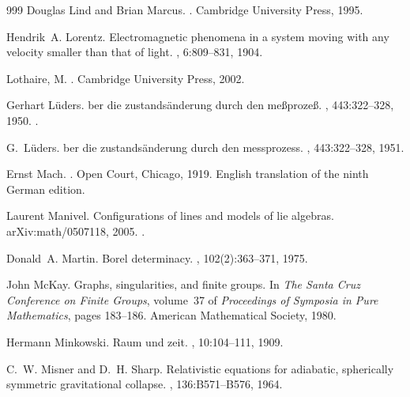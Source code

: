 \begin{thebibliography}{999}
Douglas Lind and Brian Marcus.
.
\newblock Cambridge University Press, 1995.

Hendrik~A. Lorentz.
\newblock Electromagnetic phenomena in a system moving with any velocity
  smaller than that of light.
, 6:809--831, 1904.

{Lothaire, M.}
.
\newblock Cambridge University Press, 2002.

Gerhart L{\"u}ders.
ber die zustands{\"a}nderung durch den me{\ss}proze{\ss}.
, 443:322--328, 1950.
\newblock \href {https://doi.org/10.1002/andp.19504430510}
  {}.

G.~L{\"u}ders.
ber die zustands{\"a}nderung durch den messprozess.
, 443:322--328, 1951.

Ernst Mach.
.
\newblock Open Court, Chicago, 1919.
\newblock English translation of the ninth German edition.

Laurent Manivel.
\newblock Configurations of lines and models of lie algebras.
\newblock arXiv:math/0507118, 2005.
\newblock \href {https://arxiv.org/abs/math/0507118}
  {}.

Donald~A. Martin.
\newblock Borel determinacy.
, 102(2):363--371, 1975.

John McKay.
\newblock Graphs, singularities, and finite groups.
\newblock In {\em The Santa Cruz Conference on Finite Groups}, volume~37 of
  {\em Proceedings of Symposia in Pure Mathematics}, pages 183--186. American
  Mathematical Society, 1980.

Hermann Minkowski.
\newblock Raum und zeit.
, 10:104--111, 1909.

C.~W. Misner and D.~H. Sharp.
\newblock Relativistic equations for adiabatic, spherically symmetric
  gravitational collapse.
, 136:B571--B576, 1964.


\end{thebibliography}

